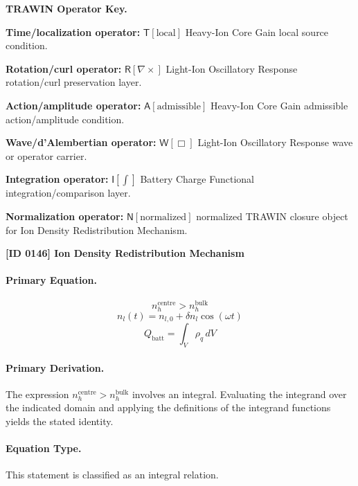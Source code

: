 \par\vspace{0.45\baselineskip}
\noindent\begin{minipage}[t]{\linewidth}
\begingroup
\small
\raggedright
\textbf{TRAWIN Operator Key.}\par
\noindent\textbf{Time/localization operator:} $\mathsf{T}\!\left[\mathrm{local}\right]$ Heavy-Ion Core Gain local source condition.\par
\noindent\textbf{Rotation/curl operator:} $\mathsf{R}\!\left[\nabla\times\right]$ Light-Ion Oscillatory Response rotation/curl preservation layer.\par
\noindent\textbf{Action/amplitude operator:} $\mathsf{A}\!\left[\mathrm{admissible}\right]$ Heavy-Ion Core Gain admissible action/amplitude condition.\par
\noindent\textbf{Wave/d'Alembertian operator:} $\mathsf{W}\!\left[\Box\right]$ Light-Ion Oscillatory Response wave or operator carrier.\par
\noindent\textbf{Integration operator:} $\mathsf{I}\!\left[\int\right]$ Battery Charge Functional integration/comparison layer.\par
\noindent\textbf{Normalization operator:} $\mathsf{N}\!\left[\mathrm{normalized}\right]$ normalized TRAWIN closure object for Ion Density Redistribution Mechanism.\par
\endgroup
\end{minipage}

\clearpage
\noindent\textbf{[ID 0146] Ion Density Redistribution Mechanism}\par
\vspace{0.35em}
\paragraph{Primary Equation.}
\[
n_h^{\mathrm{centre}} > n_h^{\mathrm{bulk}}
\]
\[
n_l(t)=n_{l,0}+\delta n_l \cos(\omega t)
\]
\[
Q_{\mathrm{batt}}=\int_V \rho_q\, dV
\]

\paragraph{Primary Derivation.}
The expression \( n_h^{\mathrm{centre}} > n_h^{\mathrm{bulk}} \) involves an integral. Evaluating the integrand over the indicated domain and applying the definitions of the integrand functions yields the stated identity.
\paragraph{Equation Type.}
This statement is classified as an integral relation.

